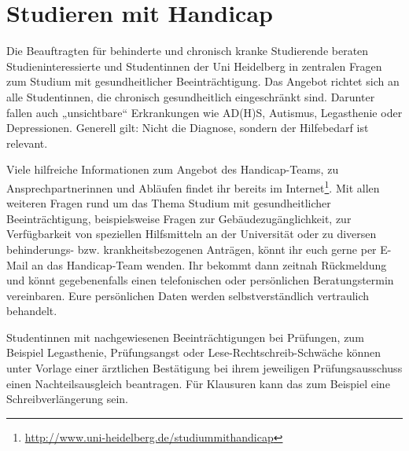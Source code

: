 \section{Studieren mit Handicap}
Die Beauftragten für behinderte und chronisch kranke Studierende beraten Studieninteressierte und Studentinnen der Uni Heidelberg in zentralen Fragen zum Studium mit gesundheitlicher Beeinträchtigung.
Das Angebot richtet sich an alle Studentinnen, die chronisch gesundheitlich eingeschränkt sind. Darunter fallen auch „unsichtbare“ Erkrankungen wie AD(H)S, Autismus, Legasthenie oder Depressionen. Generell gilt: Nicht die Diagnose, sondern der Hilfebedarf ist relevant.

Viele hilfreiche Informationen zum Angebot des Handicap-Teams, zu Ansprechpartnerinnen und Abläufen findet ihr bereits im Internet\footnote{\url{http://www.uni-heidelberg.de/studiummithandicap}}. Mit allen weiteren Fragen rund um das Thema Studium mit gesundheitlicher Beeinträchtigung, beispielsweise Fragen zur Gebäudezugänglichkeit,  zur Verfügbarkeit von speziellen Hilfsmitteln an der Universität oder zu diversen behinderungs- bzw. krankheitsbezogenen Anträgen, könnt ihr euch gerne per E-Mail an das Handicap-Team wenden. Ihr bekommt dann zeitnah Rückmeldung und könnt gegebenenfalls einen telefonischen oder persönlichen Beratungstermin vereinbaren.
Eure persönlichen Daten werden selbstverständlich vertraulich behandelt.

Studentinnen mit nachgewiesenen Beeinträchtigungen bei Prüfungen, zum Beispiel Legasthenie, Prüfungsangst oder Lese-Rechtschreib-Schwäche können unter Vorlage einer ärztlichen Bestätigung bei ihrem jeweiligen Prüfungsausschuss einen Nachteilsausgleich beantragen. Für Klausuren kann das zum Beispiel eine Schreibverlängerung sein.
